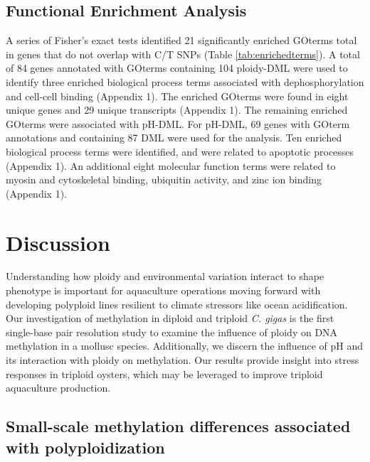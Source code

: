 \documentclass [11pt, proquest] {uwthesis}[2015/03/03]
\begin{document}
\hypertarget{functional-enrichment-analysis-1}{%
\subsection{Functional Enrichment Analysis}\label{functional-enrichment-analysis-1}}

A series of Fisher's exact tests identified 21 significantly enriched GOterms total in genes that do not overlap with C/T SNPs (Table \ref{tab:enrichedterms}). A total of 84 genes annotated with GOterms containing 104 ploidy-DML were used to identify three enriched biological process terms associated with dephosphorylation and cell-cell binding (Appendix 1). The enriched GOterms were found in eight unique genes and 29 unique transcripts (Appendix 1). The remaining enriched GOterms were associated with pH-DML. For pH-DML, 69 genes with GOterm annotations and containing 87 DML were used for the analysis. Ten enriched biological process terms were identified, and were related to apoptotic processes (Appendix 1). An additional eight molecular function terms were related to myosin and cytoskeletal binding, ubiquitin activity, and zinc ion binding (Appendix 1).

\hypertarget{discussion-3}{%
\section{Discussion}\label{discussion-3}}

Understanding how ploidy and environmental variation interact to shape phenotype is important for aquaculture operations moving forward with developing polyploid lines resilient to climate stressors like ocean acidification. Our investigation of methylation in diploid and triploid \emph{C. gigas} is the first single-base pair resolution study to examine the influence of ploidy on DNA methylation in a mollusc species. Additionally, we discern the influence of pH and its interaction with ploidy on methylation. Our results provide insight into stress responses in triploid oysters, which may be leveraged to improve triploid aquaculture production.

\hypertarget{small-scale-methylation-differences-associated-with-polyploidization}{%
\subsection{Small-scale methylation differences associated with polyploidization}\label{small-scale-methylation-differences-associated-with-polyploidization}}
\end{document}
